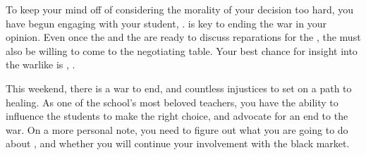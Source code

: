 \documentclass[char]{GL2020}
\begin{document}
To keep your mind off of considering the morality of your decision too hard, you have begun engaging with your \pShip{} student, \cWarlordDaughter{}. \cWarlordDaughter{} is key to ending the war in your opinion. Even once the \pFarm{} and the \pTech{} are ready to discuss reparations for the \pShippies{}, the \pShip{} must also be willing to come to the negotiating table. Your best chance for insight into the warlike \cLoud{\full} is \cLoud{\their} \cWarlordDaughter{\child}, \cWarlordDaughter{}.

This weekend, there is a war to end, and countless injustices to set on a path to healing. As one of the school’s most beloved teachers, you have the ability to influence the students to make the right choice, and advocate for an end to the war. On a more personal note, you need to figure out what you are going to do about \cLibrarian{}, and whether you will continue your involvement with the black market.
\end{document}
